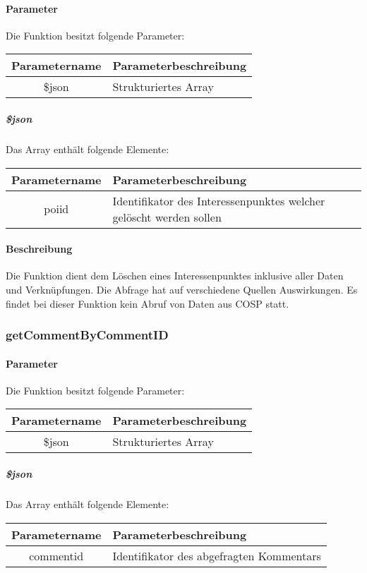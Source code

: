 \paragraph{Parameter} Die Funktion besitzt folgende Parameter:
\begin{table}[H]
	\begin{tabular}{|c|p{11cm}|}
		\hline
		\textbf{Parametername} & \textbf{Parameterbeschreibung} \\ \hline
		\$json & Strukturiertes Array \\ \hline
	\end{tabular}
\end{table}
\subparagraph{\$json}Das Array enthält folgende Elemente:
\begin{table}[H]
	\begin{tabular}{|c|p{11cm}|}
		\hline
		\textbf{Parametername} & \textbf{Parameterbeschreibung} \\ \hline
		poiid & Identifikator des Interessenpunktes welcher gelöscht werden sollen \\ \hline
	\end{tabular}
\end{table}
\paragraph{Beschreibung} Die Funktion dient dem Löschen eines Interessenpunktes inklusive aller Daten und Verknüpfungen. Die Abfrage hat auf verschiedene Quellen Auswirkungen. Es findet bei dieser Funktion kein Abruf von Daten aus {\glqq COSP\grqq} statt.
\subsubsection{getCommentByCommentID}
\paragraph{Parameter} Die Funktion besitzt folgende Parameter:
\begin{table}[H]
	\begin{tabular}{|c|p{11cm}|}
		\hline
		\textbf{Parametername} & \textbf{Parameterbeschreibung} \\ \hline
		\$json & Strukturiertes Array \\ \hline
	\end{tabular}
\end{table}
\subparagraph{\$json}Das Array enthält folgende Elemente:
\begin{table}[H]
	\begin{tabular}{|c|p{11cm}|}
		\hline
		\textbf{Parametername} & \textbf{Parameterbeschreibung} \\ \hline
		commentid & Identifikator des abgefragten Kommentars \\ \hline
	\end{tabular}
\end{table}
